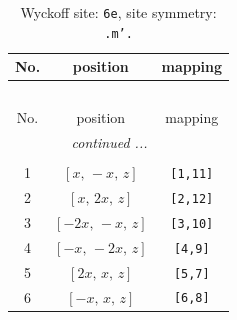\documentclass[fleqn,8pt]{jsarticle}
\begin{document}
\renewcommand{\arraystretch}{1.2}
\begin{longtable}{ccc}
\caption{Wyckoff site: {\tt 6e}, site symmetry: {\tt .m'.}}
 \\
 \hline \hline
No. & position & mapping \\ \hline \endfirsthead

\multicolumn{2}{l}{\tablename\ \thetable{}} \\
 \hline \hline
No. & position & mapping \\ \hline \endhead

 \hline \hline
\multicolumn{2}{r}{\footnotesize\it continued ...} \\ \endfoot

 \hline \hline
\multicolumn{2}{r}{} \\ \endlastfoot

1 & $\left[ x,\, - x,\, z \right]$ & {\tt [1,11]} \\ \hline
2 & $\left[ x,\, 2 x,\, z \right]$ & {\tt [2,12]} \\ \hline
3 & $\left[ - 2 x,\, - x,\, z \right]$ & {\tt [3,10]} \\ \hline
4 & $\left[ - x,\, - 2 x,\, z \right]$ & {\tt [4,9]} \\ \hline
5 & $\left[ 2 x,\, x,\, z \right]$ & {\tt [5,7]} \\ \hline
6 & $\left[ - x,\, x,\, z \right]$ & {\tt [6,8]} \\
\end{longtable}
\renewcommand{\arraystretch}{1.2}
\end{document}
